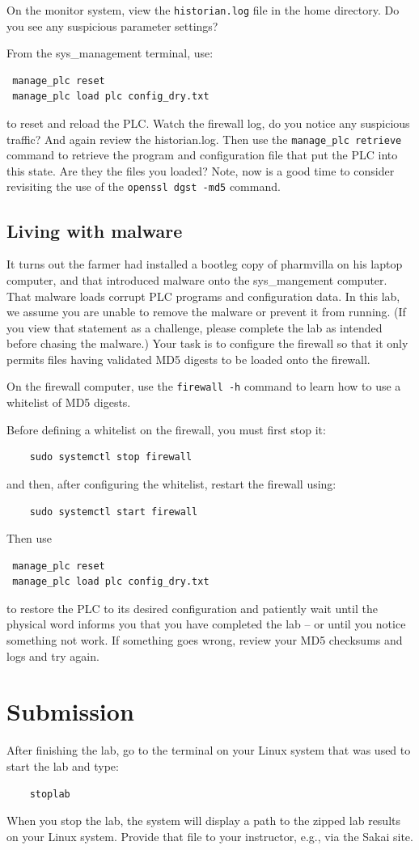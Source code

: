On the monitor system, view the {\tt historian.log} file in the home directory.  Do you see any
suspicious parameter settings?

From the sys\_management terminal, use:
\begin{verbatim}
 manage_plc reset
 manage_plc load plc config_dry.txt
\end{verbatim}
\noindent to reset and reload the PLC.  Watch the firewall log, do you notice any suspicious traffic?
And again review the historian.log.
Then use the {\tt manage\_plc retrieve} command to retrieve the program and configuration file 
that put the PLC into this state.  Are they the files you loaded?  Note, now is a good time
to consider revisiting the use of the {\tt openssl dgst -md5} command.

\subsection{Living with malware}
It turns out the farmer had installed a bootleg copy of pharmvilla on his laptop computer, and
that introduced malware onto the sys\_mangement computer.  That malware loads corrupt PLC programs and configuration
data.  In this lab, we assume you are unable to remove the malware or prevent it from running.  (If you
view that statement as a challenge, please complete the lab as intended before chasing the malware.)
Your task is to configure the firewall so that it only permits files having validated MD5 digests to be
loaded onto the firewall.

On the firewall computer, use the {\tt firewall -h} command to learn how to use a whitelist of MD5
digests.

Before defining a whitelist on the firewall, you must first stop it:
\begin{verbatim}
    sudo systemctl stop firewall
\end{verbatim}
and then, after configuring the whitelist, restart the firewall using:
\begin{verbatim}
    sudo systemctl start firewall
\end{verbatim}
\noindent Then use
\begin{verbatim}
 manage_plc reset
 manage_plc load plc config_dry.txt
\end{verbatim}
\noindent to restore the PLC to its desired configuration and patiently wait until the physical word
informs you that you have completed the lab -- or until you notice something not work. If something
goes wrong, review your MD5 checksums and logs and try again.

\section{Submission}
After finishing the lab, go to the terminal on your Linux system that was used to start the lab and type:
\begin{verbatim}
    stoplab 
\end{verbatim}
When you stop the lab, the system will display a path to the zipped lab results on your Linux system.  Provide that file to 
your instructor, e.g., via the Sakai site.

\copyrightnotice


